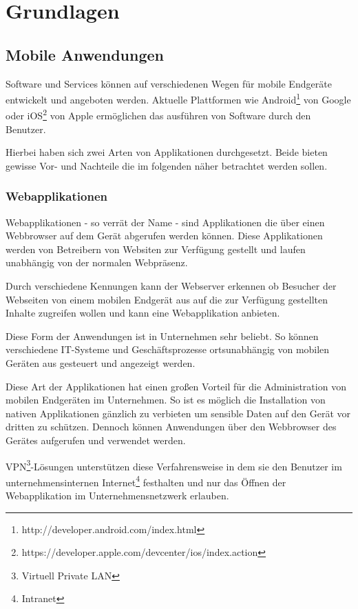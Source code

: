 \section{Grundlagen}
\subsection{Mobile Anwendungen}
Software und Services können auf verschiedenen Wegen für mobile Endgeräte entwickelt und angeboten werden. Aktuelle Plattformen wie Android\footnote{http://developer.android.com/index.html} von Google oder iOS\footnote{https://developer.apple.com/devcenter/ios/index.action} von Apple ermöglichen das ausführen von Software durch den Benutzer.

Hierbei haben sich zwei Arten von Applikationen durchgesetzt. Beide bieten gewisse Vor- und Nachteile die im folgenden näher betrachtet werden sollen.

\subsubsection{Webapplikationen}

Webapplikationen - so verrät der Name - sind Applikationen die über einen Webbrowser auf dem Gerät abgerufen werden können. Diese Applikationen werden von Betreibern von Websiten zur Verfügung gestellt und laufen unabhängig von der normalen Webpräsenz.

Durch verschiedene Kennungen kann der Webserver erkennen ob Besucher der Webseiten von einem mobilen Endgerät aus auf die zur Verfügung gestellten Inhalte zugreifen wollen und kann eine Webapplikation anbieten.

Diese Form der Anwendungen ist in Unternehmen sehr beliebt. So können verschiedene IT-Systeme und Geschäftsprozesse ortsunabhängig von mobilen Geräten aus gesteuert und angezeigt werden.

Diese Art der Applikationen hat einen großen Vorteil für die Administration von mobilen Endgeräten im Unternehmen. So ist es möglich die Installation von nativen Applikationen gänzlich zu verbieten um sensible Daten auf den Gerät vor dritten zu schützen. Dennoch können Anwendungen über den Webbrowser des Gerätes aufgerufen und verwendet werden.

VPN\footnote{Virtuell Private LAN}-Lösungen unterstützen diese Verfahrensweise in dem sie den Benutzer im unternehmensinternen Internet\footnote{Intranet} festhalten und nur das Öffnen der Webapplikation im Unternehmensnetzwerk erlauben.

